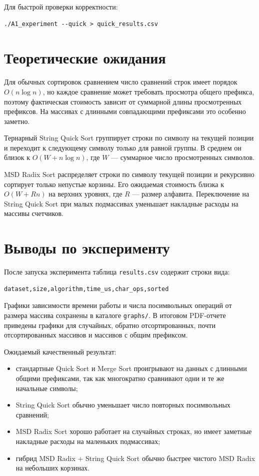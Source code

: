\documentclass[12pt,a4paper]{article}
\begin{document}
Для быстрой проверки корректности:
\begin{verbatim}
./A1_experiment --quick > quick_results.csv
\end{verbatim}

\section*{Теоретические ожидания}
Для обычных сортировок сравнением число сравнений строк имеет порядок
$O(n \log n)$, но каждое сравнение может требовать просмотра общего префикса,
поэтому фактическая стоимость зависит от суммарной длины просмотренных префиксов.
На массивах с длинными совпадающими префиксами это особенно заметно.

Тернарный String Quick Sort группирует строки по символу на текущей позиции и
переходит к следующему символу только для равной группы. В среднем он близок к
$O(W + n \log n)$, где $W$ --- суммарное число просмотренных символов.

MSD Radix Sort распределяет строки по символу текущей позиции и рекурсивно сортирует
только непустые корзины. Его ожидаемая стоимость близка к $O(W + Rn)$ на верхних
уровнях, где $R$ --- размер алфавита. Переключение на String Quick Sort при малых
подмассивах уменьшает накладные расходы на массивы счетчиков.

\section*{Выводы по эксперименту}
После запуска эксперимента таблица \texttt{results.csv} содержит строки вида:
\begin{verbatim}
dataset,size,algorithm,time_us,char_ops,sorted
\end{verbatim}

Графики зависимости времени работы и числа посимвольных операций от размера массива
сохранены в каталоге \texttt{graphs/}. В итоговом PDF-отчете приведены графики для
случайных, обратно отсортированных, почти отсортированных массивов и массивов с
общим префиксом.

Ожидаемый качественный результат:
\begin{itemize}
  \item стандартные Quick Sort и Merge Sort проигрывают на данных с длинными общими
        префиксами, так как многократно сравнивают одни и те же начальные символы;
  \item String Quick Sort обычно уменьшает число повторных посимвольных сравнений;
  \item MSD Radix Sort хорошо работает на случайных строках, но имеет заметные
        накладные расходы на маленьких подмассивах;
  \item гибрид MSD Radix + String Quick Sort обычно быстрее чистого MSD Radix на
        небольших корзинах.
\end{itemize}
\end{document}

